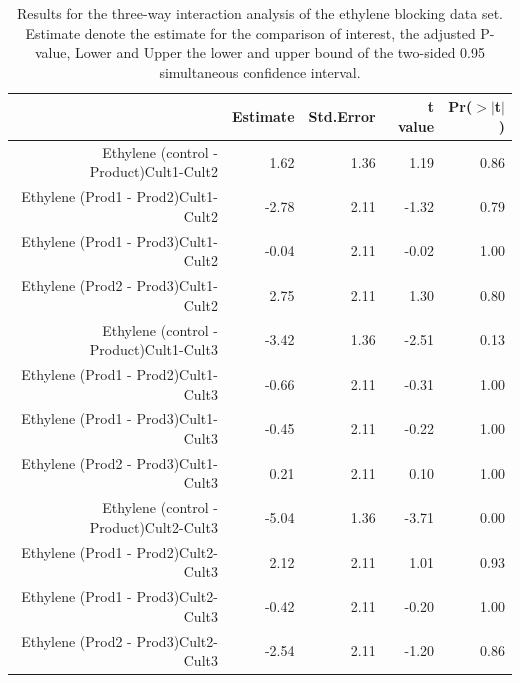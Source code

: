 \documentclass[12pt]{article}\usepackage[]{graphicx}\usepackage[]{color}
\begin{document}
\begin{table}[ht]
\centering
{\scriptsize
\begin{tabular}{rrrrr}
  \hline
 & Estimate & Std.Error & t value & Pr($>$$|$t$|$) \\ 
  \hline
Ethylene (control - Product)Cult1-Cult2 & 1.62 & 1.36 & 1.19 & 0.86 \\ 
  Ethylene (Prod1 - Prod2)Cult1-Cult2 & -2.78 & 2.11 & -1.32 & 0.79 \\ 
  Ethylene (Prod1 - Prod3)Cult1-Cult2 & -0.04 & 2.11 & -0.02 & 1.00 \\ 
  Ethylene (Prod2 - Prod3)Cult1-Cult2 & 2.75 & 2.11 & 1.30 & 0.80 \\ 
  Ethylene (control - Product)Cult1-Cult3 & -3.42 & 1.36 & -2.51 & 0.13 \\ 
  Ethylene (Prod1 - Prod2)Cult1-Cult3 & -0.66 & 2.11 & -0.31 & 1.00 \\ 
  Ethylene (Prod1 - Prod3)Cult1-Cult3 & -0.45 & 2.11 & -0.22 & 1.00 \\ 
  Ethylene (Prod2 - Prod3)Cult1-Cult3 & 0.21 & 2.11 & 0.10 & 1.00 \\ 
  Ethylene (control - Product)Cult2-Cult3 & -5.04 & 1.36 & -3.71 & 0.00 \\ 
  Ethylene (Prod1 - Prod2)Cult2-Cult3 & 2.12 & 2.11 & 1.01 & 0.93 \\ 
  Ethylene (Prod1 - Prod3)Cult2-Cult3 & -0.42 & 2.11 & -0.20 & 1.00 \\ 
  Ethylene (Prod2 - Prod3)Cult2-Cult3 & -2.54 & 2.11 & -1.20 & 0.86 \\ 
   \hline
\end{tabular}
}
\caption{Results for the three-way interaction analysis of the ethylene blocking data set. Estimate denote the estimate for the comparison of interest, the adjusted P-value, Lower and Upper the lower and upper bound of the two-sided 0.95 simultaneous confidence interval.} 
\end{table}



\newpage
\end{document}
